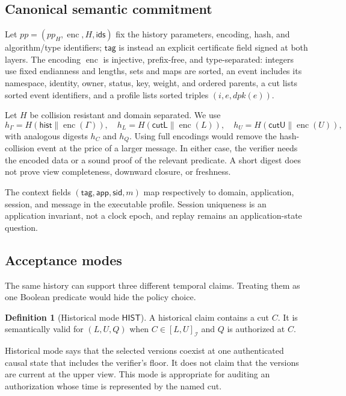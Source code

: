 \documentclass[11pt]{article}
\theoremstyle{definition}
\newtheorem{definition}[theorem]{Definition}
\newcommand{\Id}{\mathcal I}
\newcommand{\enc}{\operatorname{enc}}
\begin{document}
\subsection{Canonical semantic commitment}
Let $pp=(pp_H,\enc,H,\mathsf{ids})$ fix the history parameters, encoding, hash, and algorithm/type identifiers; $\mathsf{tag}$ is instead an explicit certificate field signed at both layers.  The encoding $\enc$ is injective, prefix-free, and type-separated: integers use fixed endianness and lengths, sets and maps are sorted, an event includes its namespace, identity, owner, status, key, weight, and ordered parents, a cut lists sorted event identifiers, and a profile lists sorted triples $(i,e,dpk(e))$.

Let $H$ be collision resistant and domain separated.  We use
\[
 h_\Gamma=H(\mathsf{hist}\parallel\enc(\Gamma)),\quad
 h_L=H(\mathsf{cutL}\parallel\enc(L)),\quad
 h_U=H(\mathsf{cutU}\parallel\enc(U)),
\]
with analogous digests $h_C$ and $h_Q$.  Using full encodings would remove the hash-collision event at the price of a larger message.  In either case, the verifier needs the encoded data or a sound proof of the relevant predicate.  A short digest does not prove view completeness, downward closure, or freshness.

The context fields $(\mathsf{tag},\mathsf{app},\mathsf{sid},m)$ map respectively to \textnormal{domain}, \textnormal{application}, \textnormal{session}, and \textnormal{message} in the executable profile.  Session uniqueness is an application invariant, not a clock epoch, and replay remains an application-state question.

\subsection{Acceptance modes}
The same history can support three different temporal claims.  Treating them as one Boolean predicate would hide the policy choice.

\begin{definition}[Historical mode $\mathsf{HIST}$]
A historical claim contains a cut $C$.  It is semantically valid for $(L,U,Q)$ when $C\in[L,U]_{\Id}$ and $Q$ is authorized at $C$.
\end{definition}
Historical mode says that the selected versions coexist at one authenticated causal state that includes the verifier's floor.  It does not claim that the versions are current at the upper view.  This mode is appropriate for auditing an authorization whose time is represented by the named cut.
\end{document}
